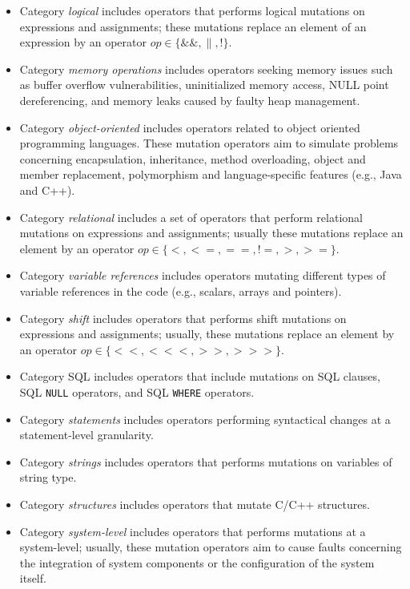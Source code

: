 \begin{itemize}
\item Category \emph{logical} includes operators that performs logical mutations on expressions and assignments; these mutations replace an element of an expression by an operator $op \in \{\&\&, \|, !\}$.
\item Category \emph{memory operations} includes operators seeking memory issues such as buffer overflow vulnerabilities, uninitialized memory access, NULL point dereferencing, and memory leaks caused by faulty heap management.
\item Category \emph{object-oriented} includes operators related to object oriented programming languages. These mutation operators aim to simulate problems concerning encapsulation, inheritance, method overloading, object and member replacement, polymorphism and language-specific features (e.g., Java and C++).
\item Category \emph{relational} includes a set of operators that perform relational mutations on expressions and assignments; usually these mutations replace an element by an operator $op \in \{<, <=, ==, !=, >, >=\}$.
\item Category \emph{variable references} includes operators mutating different types of variable references in the code (e.g., scalars, arrays and pointers).
\item Category \emph{shift} includes operators that performs shift mutations on expressions and assignments; usually, these mutations replace an element by an operator $op \in \{<<, <<<, >>, >>>\}$.
\item Category SQL includes operators that include mutations on SQL clauses, SQL \texttt{NULL} operators, and SQL \texttt{WHERE} operators.
\item Category \emph{statements} includes operators performing syntactical changes at a statement-level granularity.
\item Category \emph{strings} includes operators that performs mutations on variables of string type.
\item Category \emph{structures} includes operators that mutate C/C++ structures.
\item Category \emph{system-level} includes operators that performs mutations at a system-level; usually, these mutation operators aim to cause faults concerning the integration of system components or the configuration of the system itself. 
\end{itemize}








